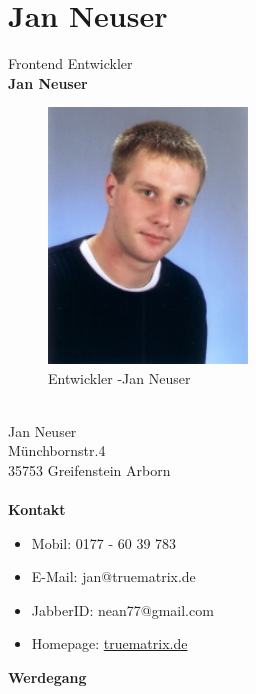 \section{Jan Neuser}
\label{section:Jan Neuser}
Frontend Entwickler \\
\textbf{Jan Neuser}
\\
\begin{figure}[h]
   \includegraphics[width=150pt]{../bilder/jan.jpg}
   \caption{Entwickler -Jan Neuser}
   \label{Entwickler - Frontend und Datenbank}
\end{figure}
\\
Jan Neuser \\
Münchbornstr.4 \\
35753 Greifenstein Arborn \\
\\
\textbf{Kontakt} \\
\begin{itemize}
\item Mobil: 0177 - 60 39 783
\item E-Mail: jan@truematrix.de
\item JabberID: nean77@gmail.com 
\item Homepage: \href{http://www.truematrix.de}{truematrix.de}
\end{itemize}
\textbf{Werdegang} \\


